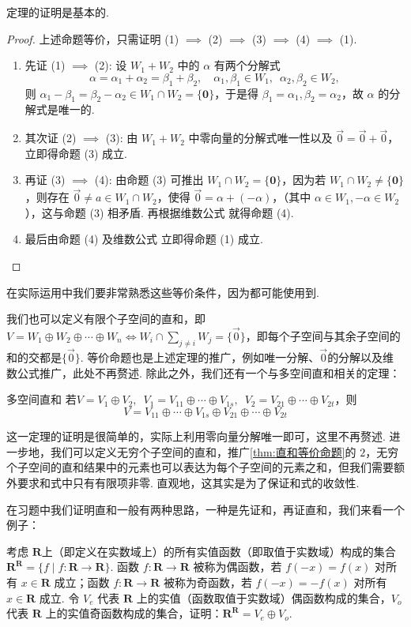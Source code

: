 定理的证明是基本的.
\begin{proof}
    上述命题等价，只需证明 (1) $\implies$ (2) $\implies$ (3) $\implies$ (4) $\implies$ (1).
    \begin{enumerate}
        \item 先证 (1) $\implies$ (2): 设 $W_1 + W_2$ 中的 $\alpha$ 有两个分解式
        \[
            \alpha = \alpha_1 + \alpha_2 = \beta_1 + \beta_2, \quad \alpha_1, \beta_1 \in W_1, \enspace \alpha_2, \beta_2 \in W_2,
        \]
        则 $\alpha_1 - \beta_1 = \beta_2 - \alpha_2 \in W_1 \cap W_2 = \{\mathbf{0}\}$，于是得 $\beta_1 = \alpha_1, \beta_2 = \alpha_2$，故 $\alpha$ 的分解式是唯一的.
        \item 其次证 (2) $\implies$ (3): 由 $W_1 + W_2$ 中零向量的分解式唯一性以及 $\vec{0} = \vec{0} + \vec{0}$，立即得命题 (3) 成立.
        \item 再证 (3) $\implies$ (4): 由命题 (3) 可推出 $W_1 \cap W_2 = \{\mathbf{0}\}$，因为若 $W_1 \cap W_2 \ne \{\mathbf{0}\}$，则存在 $\vec{0} \ne a \in W_1 \cap W_2$，使得 $\vec{0} = \alpha + (-\alpha)$，（其中 $\alpha \in W_1, -\alpha \in W_2$），这与命题 (3) 相矛盾. 再根据维数公式 就得命题 (4).
        \item 最后由命题 (4) 及维数公式 立即得命题 (1) 成立.
    \end{enumerate}
\end{proof}
在实际运用中我们要非常熟悉这些等价条件，因为都可能使用到.

我们也可以定义有限个子空间的直和，即$V=W_1\oplus W_2\oplus\cdots\oplus W_n \iff W_i \cap \sum\limits_{j \neq i}W_j=\{\vec{0}\}$，即每个子空间与其余子空间的和的交都是$\{\vec{0}\}$. 等价命题也是上述定理的推广，例如唯一分解、$\vec{0}$的分解以及维数公式推广，此处不再赘述. 除此之外，我们还有一个与多空间直和相关的定理：
\begin{theorem}{}{多空间直和}
    若$V=V_1\oplus V_2,\enspace V_1=V_{11}\oplus\cdots\oplus V_{1s},\enspace V_2=V_{21}\oplus\cdots\oplus V_{2t}$，则
    \[V=V_{11}\oplus\cdots\oplus V_{1s}\oplus V_{21}\oplus\cdots\oplus V_{2t}\]
\end{theorem}
这一定理的证明是很简单的，实际上利用零向量分解唯一即可，这里不再赘述. 进一步地，我们可以定义无穷个子空间的直和，推广\autoref{thm:直和等价命题}的 $2$，无穷个子空间的直和结果中的元素也可以表达为每个子空间的元素之和，但我们需要额外要求和式中只有有限项非零. 直观地，这其实是为了保证和式的收敛性.

在习题中我们证明直和一般有两种思路，一种是先证和，再证直和，我们来看一个例子：
\begin{example}{}{}
    考虑 $\mathbf{R}$上（即定义在实数域上）的所有实值函数（即取值于实数域）构成的集合 $\mathbf{R}^\mathbf{R} = \{f \mid f: \mathbf{R} \to \mathbf{R}\}$.  函数 $f: \mathbf{R} \to \mathbf{R}$ 被称为偶函数，若 $f(-x) = f(x)$ 对所有 $x \in \mathbf{R}$ 成立；函数 $f: \mathbf{R} \to \mathbf{R}$ 被称为奇函数，若 $f(-x) = -f(x)$ 对所有 $x \in \mathbf{R}$ 成立. 令 $V_e$ 代表 $\mathbf{R}$ 上的实值（函数取值于实数域）偶函数构成的集合，$V_o$ 代表 $\mathbf{R}$ 上的实值奇函数构成的集合，证明：$\mathbf{R}^\mathbf{R} = V_e \oplus V_o$.
\end{example}

